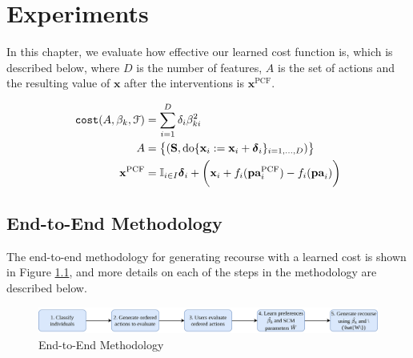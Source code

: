 \chapter{Experiments} \label{chapter:experiments}

In this chapter, we evaluate how effective our learned cost function is, which is described below, where $D$ is the number of features, $A$ is the set of actions and the resulting value of $\mathbf{x}$ after the interventions is $\mathbf{x}^{\text{PCF}}$.

\begin{align} \label{eq:cost_function_experiments}
	\operatorname*{\texttt{cost}}(A, \beta_k, \mathcal{F}) & = \sum_{i=1}^D \delta_i \beta_{ki}^2 \\ \nonumber
	A & = \big\{(\mathbf{S}, \text{do} \{\mathbf{x}_i:=\mathbf{x}_i + \boldsymbol{\delta}_i\}_{i=1, \ldots, D})\big\} \\ \nonumber
	\mathbf{x}^{\text{PCF}} & = \mathbb{I}_{i \in I} \boldsymbol{\delta}_i + \bigg( \mathbf{x}_i + f_i(\textbf{pa}^{\text{PCF}}_i) - f_i(\textbf{pa}_i) \bigg)
\end{align}

\section{End-to-End Methodology}

The end-to-end methodology for generating recourse with a learned cost is shown in Figure \ref{fig:workflow}, and more details on each of the steps in the methodology are described below.

\begin{figure}[!htb]
	\centering
	\includegraphics[width=\linewidth]{images/draw.io/workflow.png}
	\caption{End-to-End Methodology}
	\label{fig:workflow}
\end{figure}

